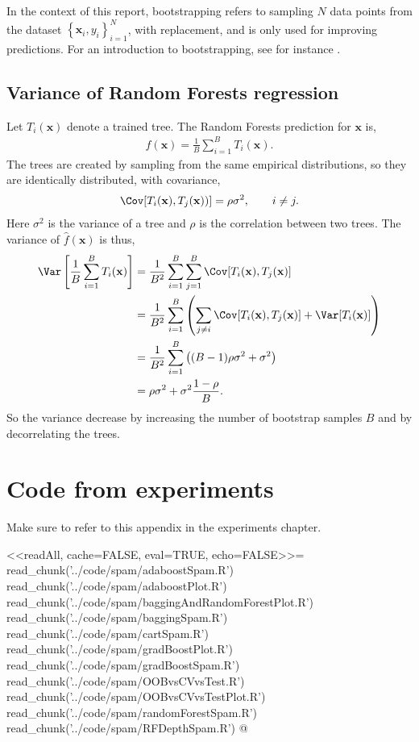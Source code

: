In the context of this report, bootstrapping refers to sampling $N$ data points from the dataset $\left\{ \mathbf{x}_i, y_i \right\}_{i = 1}^N$, with replacement, and is only used for improving predictions. 
For an introduction to bootstrapping, see for instance \cite{efron1994bootstrap}.


\section{Variance of Random Forests regression}
\label{sec:Variance for Random Forests regression}
Let $T_i(\mathbf{x})$ denote a trained tree. The Random Forests prediction for $\mathbf{x}$ is,
\begin{align}
  \hat f(\mathbf{x}) = \frac{1}{B} \sum_{i = 1}^{B} T_i(\mathbf{x}).
\end{align}
The trees are created by sampling from the same empirical distributions, so they are identically distributed, with covariance,
\begin{align}
  \Cov[T_i(\mathbf{x}), T_j(\mathbf{x}))] = \rho \sigma^2, \quad \quad i \neq j.
\end{align}
Here $\sigma^2$ is the variance of a tree and $\rho$ is the correlation between two trees.  
The variance of $\hat f(\mathbf{x})$ is thus,
\begin{align}
\Var\left[ \frac{1}{B} \sum_{i = 1}^{B} T_i(\mathbf{x}) \right] 
&= \frac{1}{B^2} \sum_{i =1}^B \sum_{j= 1}^B \Cov[T_i(\mathbf{x}), T_j(\mathbf{x})] \notag \\
&= \frac{1}{B^2} \sum_{i =1}^B \left(\sum_{j \neq i} \Cov[T_i(\mathbf{x}), T_j(\mathbf{x})] + \Var[T_i(\mathbf{x})]  \right)\notag \\
&= \frac{1}{B^2} \sum_{i =1}^B \left( (B-1) \rho \sigma^2 + \sigma^2  \right)\notag \\
&= \rho \sigma^2 + \sigma^2 \frac{1-\rho}{B}.
\end{align}
So the variance decrease by increasing the number of bootstrap samples $B$ and by decorrelating the trees.

\chapter{Code from experiments}
\label{chap:Code}
Make sure to refer to this appendix in the experiments chapter.

<<readAll, cache=FALSE, eval=TRUE, echo=FALSE>>=
read_chunk('../code/spam/adaboostSpam.R')
read_chunk('../code/spam/adaboostPlot.R')
read_chunk('../code/spam/baggingAndRandomForestPlot.R')
read_chunk('../code/spam/baggingSpam.R')
read_chunk('../code/spam/cartSpam.R')
read_chunk('../code/spam/gradBoostPlot.R')
read_chunk('../code/spam/gradBoostSpam.R')
read_chunk('../code/spam/OOBvsCVvsTest.R')
read_chunk('../code/spam/OOBvsCVvsTestPlot.R')
read_chunk('../code/spam/randomForestSpam.R')
read_chunk('../code/spam/RFDepthSpam.R')
@

